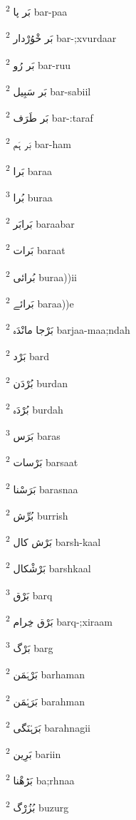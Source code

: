 \documentclass[12pt]{article}
\begin{document}
\begin{multicols}{5}
{\ur بَر پا}   \textsuperscript{2} bar-paa

{\ur بَر خْوُرْدار}   \textsuperscript{2} bar-;xvurdaar

{\ur بَر رُو}   \textsuperscript{2} bar-ruu

{\ur بَر سَبِیل}   \textsuperscript{2} bar-sabiil

{\ur بَر طَرَف}   \textsuperscript{2} bar-:taraf

{\ur بَر ہَم}   \textsuperscript{2} bar-ham

{\ur بَرا}   \textsuperscript{2} baraa

{\ur بُرا}   \textsuperscript{3} buraa

{\ur بَرابَر}   \textsuperscript{2} baraabar

{\ur بَرات}   \textsuperscript{2} baraat

{\ur بُرائی}   \textsuperscript{2} buraa))ii

{\ur بَرائے}   \textsuperscript{2} baraa))e

{\ur بَرْجا مانْدَہ}   \textsuperscript{2} barjaa-maa;ndah

{\ur بَرْد}   \textsuperscript{2} bard

{\ur بُرْدَن}   \textsuperscript{2} burdan

{\ur بُرْدَہ}   \textsuperscript{2} burdah

{\ur بَرَس}   \textsuperscript{3} baras

{\ur بَرْسات}   \textsuperscript{2} barsaat

{\ur بَرَسْنا}   \textsuperscript{2} barasnaa

{\ur بُرِّش}   \textsuperscript{2} burrish

{\ur بَرْش کال}   \textsuperscript{2} barsh-kaal

{\ur بَرْشْکال}   \textsuperscript{2} barshkaal

{\ur بَرْق}   \textsuperscript{3} barq

{\ur بَرْق خِرام}   \textsuperscript{2} barq-;xiraam

{\ur بَرْگ}   \textsuperscript{3} barg

{\ur بَرْہَمَن}   \textsuperscript{2} barhaman

{\ur بَرَہْمَن}   \textsuperscript{2} barahman

{\ur بَرَہْنَگی}   \textsuperscript{2} barahnagii

{\ur بَرِین}   \textsuperscript{2} bariin

{\ur بَڑھْنا}   \textsuperscript{2} ba;rhnaa

{\ur بُزُرْگ}   \textsuperscript{2} buzurg


\end{multicols}
\end{document}
